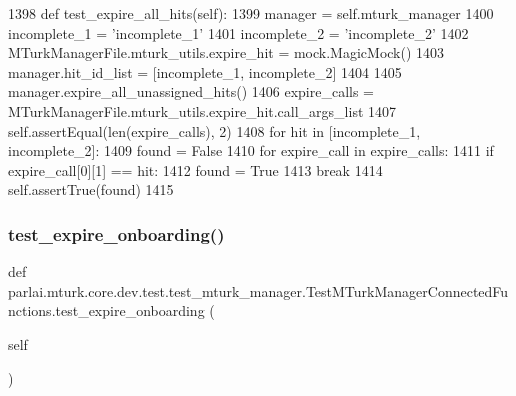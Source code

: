 \begin{DoxyCode}
1398     \textcolor{keyword}{def }test\_expire\_all\_hits(self):
1399         manager = self.mturk\_manager
1400         incomplete\_1 = \textcolor{stringliteral}{'incomplete\_1'}
1401         incomplete\_2 = \textcolor{stringliteral}{'incomplete\_2'}
1402         MTurkManagerFile.mturk\_utils.expire\_hit = mock.MagicMock()
1403         manager.hit\_id\_list = [incomplete\_1, incomplete\_2]
1404 
1405         manager.expire\_all\_unassigned\_hits()
1406         expire\_calls = MTurkManagerFile.mturk\_utils.expire\_hit.call\_args\_list
1407         self.assertEqual(len(expire\_calls), 2)
1408         \textcolor{keywordflow}{for} hit \textcolor{keywordflow}{in} [incomplete\_1, incomplete\_2]:
1409             found = \textcolor{keyword}{False}
1410             \textcolor{keywordflow}{for} expire\_call \textcolor{keywordflow}{in} expire\_calls:
1411                 \textcolor{keywordflow}{if} expire\_call[0][1] == hit:
1412                     found = \textcolor{keyword}{True}
1413                     \textcolor{keywordflow}{break}
1414             self.assertTrue(found)
1415 
\end{DoxyCode}
\mbox{\label{classparlai_1_1mturk_1_1core_1_1dev_1_1test_1_1test__mturk__manager_1_1TestMTurkManagerConnectedFunctions_ab4d94c614264f70168dc18a97b9d2e19}} 
\subsubsection{\texorpdfstring{test\+\_\+expire\+\_\+onboarding()}{test\_expire\_onboarding()}}
{\footnotesize\ttfamily def parlai.\+mturk.\+core.\+dev.\+test.\+test\+\_\+mturk\+\_\+manager.\+Test\+M\+Turk\+Manager\+Connected\+Functions.\+test\+\_\+expire\+\_\+onboarding (\begin{DoxyParamCaption}\item[{}]{self }\end{DoxyParamCaption})}



